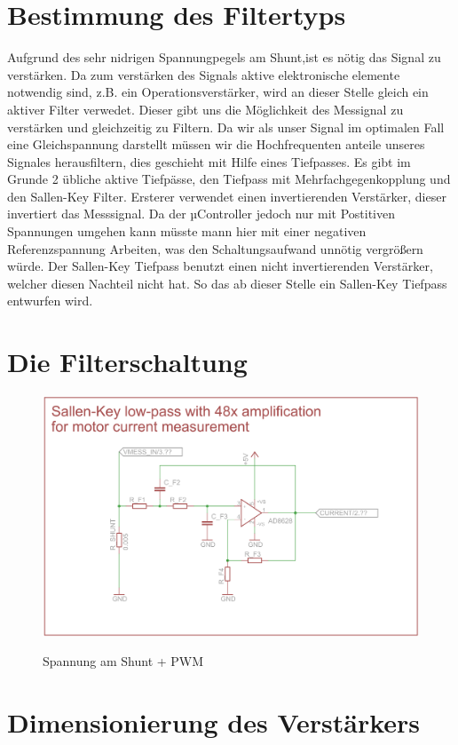 \documentclass[11pt,twoside,a4paper,openright]{mpreport}
\begin{document}
\section{Bestimmung des Filtertyps}
Aufgrund des sehr nidrigen Spannungpegels am Shunt,ist es nötig das Signal zu verstärken. Da zum verstärken des Signals aktive elektronische elemente notwendig sind,
z.B. ein Operationsverstärker, wird an dieser Stelle gleich ein aktiver Filter verwedet. Dieser gibt uns die Möglichkeit des Messignal zu verstärken und gleichzeitig zu
Filtern. Da wir als unser Signal im optimalen Fall eine Gleichspannung darstellt müssen wir die Hochfrequenten anteile unseres Signales herausfiltern, dies geschieht 
mit Hilfe eines Tiefpasses. Es gibt im Grunde 2 übliche aktive Tiefpässe, den Tiefpass mit Mehrfachgegenkopplung und den Sallen-Key Filter. Ersterer verwendet
einen invertierenden Verstärker, dieser invertiert das Messsignal. Da der µController jedoch nur mit Postitiven Spannungen umgehen kann müsste mann hier mit einer 
negativen Referenzspannung Arbeiten, was den Schaltungsaufwand unnötig vergrößern würde. Der Sallen-Key Tiefpass benutzt einen nicht invertierenden Verstärker, welcher diesen
Nachteil nicht hat. So das ab dieser Stelle ein Sallen-Key Tiefpass entwurfen wird.


\section{Die Filterschaltung}
\begin{figure}[H]
\centering
\includegraphics[width=.8\textwidth]{filter_schaltung.png}\\
\caption{Spannung am Shunt + PWM}%
\label{fig:pwm+i}
\end{figure}



\section{Dimensionierung des Verstärkers}
\end{document}
